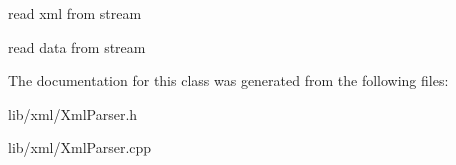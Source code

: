 read xml from stream 

read data from stream 

\-The documentation for this class was generated from the following files\-:\begin{DoxyCompactItemize}
\item 
lib/xml/\-Xml\-Parser.\-h\item 
lib/xml/\-Xml\-Parser.\-cpp\end{DoxyCompactItemize}
